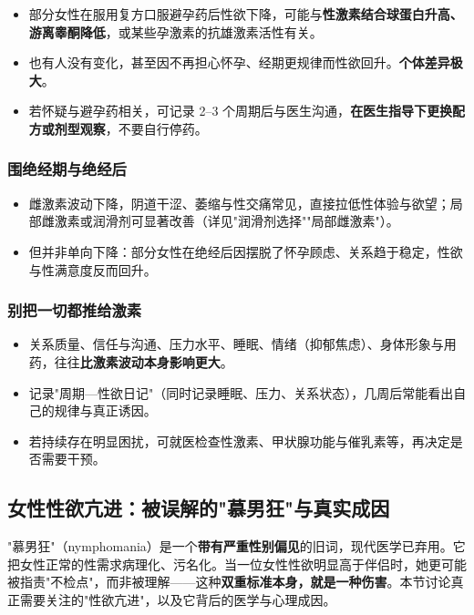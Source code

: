 \begin{itemize}
	\item 部分女性在服用复方口服避孕药后性欲下降，可能与\textbf{性激素结合球蛋白升高、游离睾酮降低}，或某些孕激素的抗雄激素活性有关。
	\item 也有人没有变化，甚至因不再担心怀孕、经期更规律而性欲回升。\textbf{个体差异极大}。
	\item 若怀疑与避孕药相关，可记录 2--3 个周期后与医生沟通，\textbf{在医生指导下更换配方或剂型观察}，不要自行停药。
\end{itemize}

\subsubsection{围绝经期与绝经后}

\begin{itemize}
	\item 雌激素波动下降，阴道干涩、萎缩与性交痛常见，直接拉低性体验与欲望；局部雌激素或润滑剂可显著改善（详见"润滑剂选择""局部雌激素"）。
	\item 但并非单向下降：部分女性在绝经后因摆脱了怀孕顾虑、关系趋于稳定，性欲与性满意度反而回升。
\end{itemize}

\subsubsection{别把一切都推给激素}

\begin{itemize}
	\item 关系质量、信任与沟通、压力水平、睡眠、情绪（抑郁焦虑）、身体形象与用药，往往\textbf{比激素波动本身影响更大}。
	\item 记录"周期—性欲日记"（同时记录睡眠、压力、关系状态），几周后常能看出自己的规律与真正诱因。
	\item 若持续存在明显困扰，可就医检查性激素、甲状腺功能与催乳素等，再决定是否需要干预。
\end{itemize}

\subsection{女性性欲亢进：被误解的"慕男狂"与真实成因}

"慕男狂"（nymphomania）是一个\textbf{带有严重性别偏见}的旧词，现代医学已弃用。它把女性正常的性需求病理化、污名化。当一位女性性欲明显高于伴侣时，她更可能被指责"不检点"，而非被理解——这种\textbf{双重标准本身，就是一种伤害}。本节讨论真正需要关注的"性欲亢进"，以及它背后的医学与心理成因。

